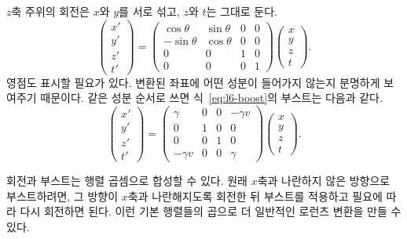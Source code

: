 \(z\)축 주위의 회전은 \(x\)와 \(y\)를 서로 섞고, \(z\)와 \(t\)는 그대로 둔다. \begin{equation}
\begin{pmatrix}
  x'\\ y'\\ z'\\ t'
\end{pmatrix}
=
\begin{pmatrix}
  \cos\theta & \sin\theta & 0 & 0\\
  -\sin\theta & \cos\theta & 0 & 0\\
  0 & 0 & 1 & 0\\
  0 & 0 & 0 & 1
\end{pmatrix}
\begin{pmatrix}
  x\\ y\\ z\\ t
\end{pmatrix}.
\end{equation} 영점도 표시할 필요가 있다. 변환된 좌표에 어떤 성분이 들어가지 않는지 분명하게 보여주기 때문이다. 같은 성분 순서로 쓰면 식~\eqref{eq:l6-boost}의 부스트는 다음과 같다. \begin{equation}
\begin{pmatrix}
  x'\\ y'\\ z'\\ t'
\end{pmatrix}
=
\begin{pmatrix}
  \gamma & 0 & 0 & -\gamma v\\
  0 & 1 & 0 & 0\\
  0 & 0 & 1 & 0\\
  -\gamma v & 0 & 0 & \gamma
\end{pmatrix}
\begin{pmatrix}
  x\\ y\\ z\\ t
\end{pmatrix}.
\end{equation}

회전과 부스트는 행렬 곱셈으로 합성할 수 있다. 원래 \(x\)축과 나란하지 않은 방향으로 부스트하려면, 그 방향이 \(x\)축과 나란해지도록 회전한 뒤 부스트를 적용하고 필요에 따라 다시 회전하면 된다. 이런 기본 행렬들의 곱으로 더 일반적인 로런츠 변환을 만들 수 있다.

\begin{classroomqa}\end{classroomqa}

